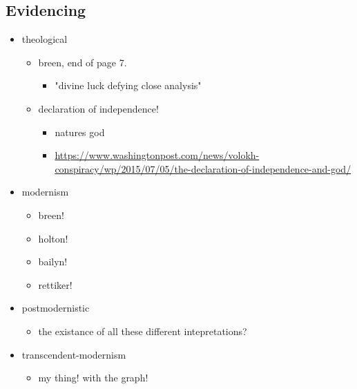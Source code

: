 \documentclass[letterpaper]{article}
\begin{document}
\subsection{Evidencing}
\label{sec:org965347a}
\begin{itemize}
\item theological

\begin{itemize}
\item breen, end of page 7.

\begin{itemize}
\item "divine luck defying close analysis"
\end{itemize}

\item declaration of independence!

\begin{itemize}
\item natures god
\item \url{https://www.washingtonpost.com/news/volokh-conspiracy/wp/2015/07/05/the-declaration-of-independence-and-god/}
\end{itemize}
\end{itemize}

\item modernism

\begin{itemize}
\item breen!
\item holton!
\item bailyn!
\item rettiker!
\end{itemize}

\item postmodernistic

\begin{itemize}
\item the existance of all these different intepretations?
\end{itemize}

\item transcendent-modernism

\begin{itemize}
\item my thing! with the graph!
\end{itemize}
\end{itemize}
\end{document}
